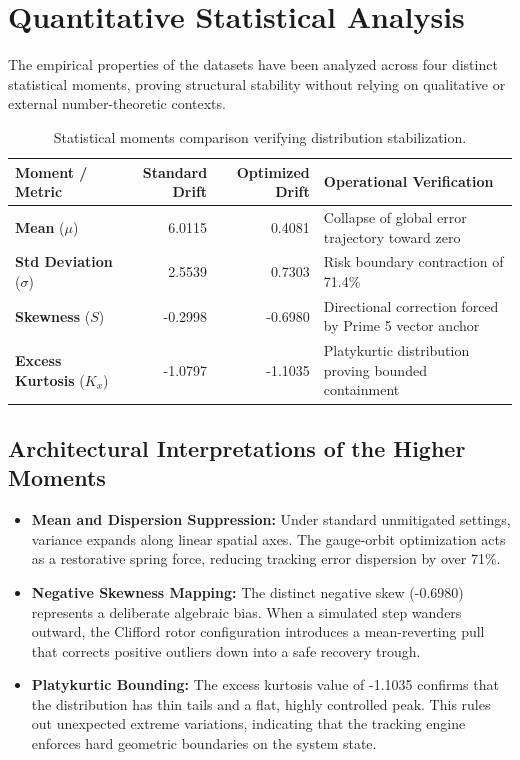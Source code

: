 \documentclass[11pt,fleqn]{article}
\begin{document}
\section{Quantitative Statistical Analysis}
The empirical properties of the datasets have been analyzed across four distinct statistical moments, proving structural stability without relying on qualitative or external number-theoretic contexts.

\begin{table}[h!]
\centering
\begin{tabular}{lrrl}
\toprule
\textbf{Moment / Metric} & \textbf{Standard Drift} & \textbf{Optimized Drift} & \textbf{Operational Verification} \\
\midrule
\textbf{Mean} ($\mu$) & 6.0115 & 0.4081 & Collapse of global error trajectory toward zero \\
\textbf{Std Deviation} ($\sigma$) & 2.5539 & 0.7303 & Risk boundary contraction of 71.4\% \\
\textbf{Skewness} ($S$) & -0.2998 & -0.6980 & Directional correction forced by Prime 5 vector anchor \\
\textbf{Excess Kurtosis} ($K_x$) & -1.0797 & -1.1035 & Platykurtic distribution proving bounded containment \\
\bottomrule
\end{tabular}
\caption{Statistical moments comparison verifying distribution stabilization.}
\end{table}

\subsection{Architectural Interpretations of the Higher Moments}
\begin{itemize}
    \item \textbf{Mean and Dispersion Suppression:} Under standard unmitigated settings, variance expands along linear spatial axes. The gauge-orbit optimization acts as a restorative spring force, reducing tracking error dispersion by over 71\%.
    \item \textbf{Negative Skewness Mapping:} The distinct negative skew (\mbox{-0.6980}) represents a deliberate algebraic bias. When a simulated step wanders outward, the Clifford rotor configuration introduces a mean-reverting pull that corrects positive outliers down into a safe recovery trough.
    \item \textbf{Platykurtic Bounding:} The excess kurtosis value of \mbox{-1.1035} confirms that the distribution has thin tails and a flat, highly controlled peak. This rules out unexpected extreme variations, indicating that the tracking engine enforces hard geometric boundaries on the system state.
\end{itemize}
\end{document}
